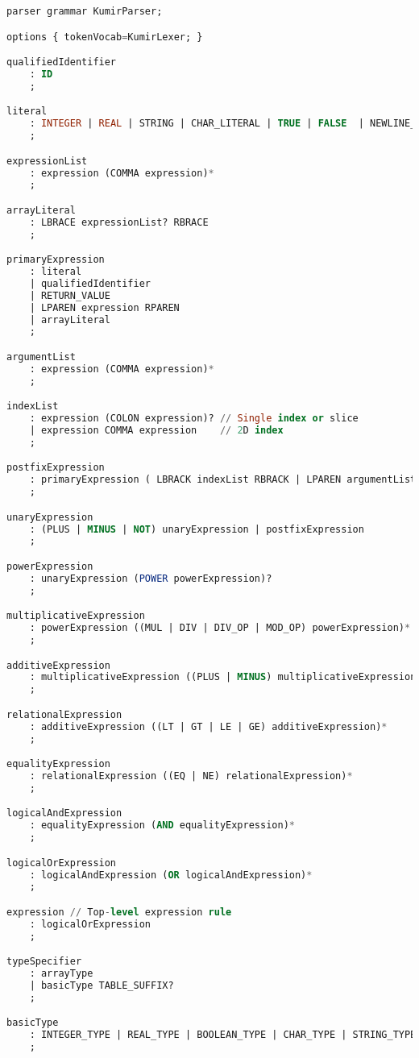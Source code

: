 \begin{lstlisting}[language=sql, caption={Парсер грамматики в формате ANTRL}, label=lst:kafka-click2]
parser grammar KumirParser;

options { tokenVocab=KumirLexer; } 

qualifiedIdentifier
    : ID 
    ;

literal
    : INTEGER | REAL | STRING | CHAR_LITERAL | TRUE | FALSE  | NEWLINE_CONST
    ;

expressionList
    : expression (COMMA expression)*
    ;

arrayLiteral 
    : LBRACE expressionList? RBRACE
    ;

primaryExpression
    : literal
    | qualifiedIdentifier 
    | RETURN_VALUE        
    | LPAREN expression RPAREN 
    | arrayLiteral
    ;

argumentList 
    : expression (COMMA expression)*
    ;

indexList 
    : expression (COLON expression)? // Single index or slice
    | expression COMMA expression    // 2D index
    ;

postfixExpression
    : primaryExpression ( LBRACK indexList RBRACK | LPAREN argumentList? RPAREN )*
    ;

unaryExpression 
    : (PLUS | MINUS | NOT) unaryExpression | postfixExpression
    ;

powerExpression
    : unaryExpression (POWER powerExpression)?
    ;

multiplicativeExpression 
    : powerExpression ((MUL | DIV | DIV_OP | MOD_OP) powerExpression)*
    ;

additiveExpression
    : multiplicativeExpression ((PLUS | MINUS) multiplicativeExpression)*
    ;

relationalExpression 
    : additiveExpression ((LT | GT | LE | GE) additiveExpression)*
    ;

equalityExpression
    : relationalExpression ((EQ | NE) relationalExpression)*
    ;

logicalAndExpression 
    : equalityExpression (AND equalityExpression)*
    ;

logicalOrExpression 
    : logicalAndExpression (OR logicalAndExpression)*
    ;

expression // Top-level expression rule
    : logicalOrExpression
    ;

typeSpecifier 
    : arrayType              
    | basicType TABLE_SUFFIX?
    ;

basicType 
    : INTEGER_TYPE | REAL_TYPE | BOOLEAN_TYPE | CHAR_TYPE | STRING_TYPE
    ;


\end{lstlisting}
